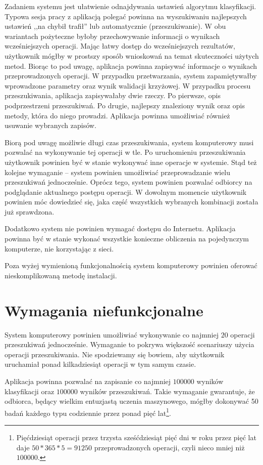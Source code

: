 \documentclass[../thesis.tex]{subfiles}
\begin{document}
Zadaniem systemu jest ułatwienie odnajdywania ustawień algorytmu klasyfikacji. Typowa sesja pracy z aplikacją polegać powinna na wyszukiwaniu najlepszych ustawień ,,na chybił trafił'' lub automatycznie (przeszukiwanie). W obu wariantach pożyteczne byłoby przechowywanie informacji o wynikach wcześniejszych operacji. Mając łatwy dostęp do wcześniejszych rezultatów, użytkownik mógłby w prostszy sposób wnioskowań na temat skuteczności użytych metod. Biorąc to pod uwagę, aplikacja powinna zapisywać informacje o wynikach przeprowadzonych operacji. W przypadku przetwarzania, system zapamiętywałby wprowadzone parametry oraz wynik walidacji krzyżowej. W przypadku procesu przeszukiwania, aplikacja zapisywałaby dwie rzeczy. Po pierwsze, opis podprzestrzeni przeszukiwań. Po drugie, najlepszy znaleziony wynik oraz opis metody, która do niego prowadzi. Aplikacja powinna umożliwiać również usuwanie wybranych zapisów.

Biorą pod uwagę możliwie długi czas przeszukiwania, system komputerowy musi pozwalać na wykonywanie tej operacji w tle. Po uruchomieniu przeszukiwania użytkownik powinien być w stanie wykonywać inne operacje w systemie. Stąd też kolejne wymaganie -- system powinien umożliwiać przeprowadzanie wielu przeszukiwań jednocześnie. Oprócz tego, system powinien pozwalać odbiorcy na podglądanie aktualnego postępu operacji. W dowolnym momencie użytkownik powinien móc dowiedzieć się, jaka część wszystkich wybranych kombinacji została już sprawdzona.

Dodatkowo system nie powinien wymagać dostępu do Internetu. Aplikacja powinna być w stanie wykonać wszystkie konieczne obliczenia na pojedynczym komputerze, nie korzystając z sieci.

Poza wyżej wymienioną funkcjonalnością system komputerowy powinien oferować nieskomplikowaną metodę instalacji. 

\section{Wymagania niefunkcjonalne}

System komputerowy powinien umożliwiać wykonywanie co najmniej $20$ operacji przeszukiwań jednocześnie. Wymaganie to pokrywa większość scenariuszy użycia operacji przeszukiwania. Nie spodziewamy się bowiem, aby użytkownik uruchamiał ponad kilkadziesiąt operacji w tym samym czasie.

Aplikacja powinna pozwalać na zapisanie co najmniej $100000$ wyników klasyfikacji oraz $100000$ wyników przeszukiwań. Takie wymaganie gwarantuje, że odbiorca, będący wielkim entuzjastą uczenia maszynowego, mógłby dokonywać 50 badań każdego typu codziennie przez ponad pięć lat\footnote{Pięćdziesiąt operacji przez trzysta sześćdziesiąt pięć dni w roku przez pięć lat daje $50 * 365 * 5 = 91250$ przeprowadzonych operacji, czyli nieco mniej niż $100000$.}.
\end{document}
